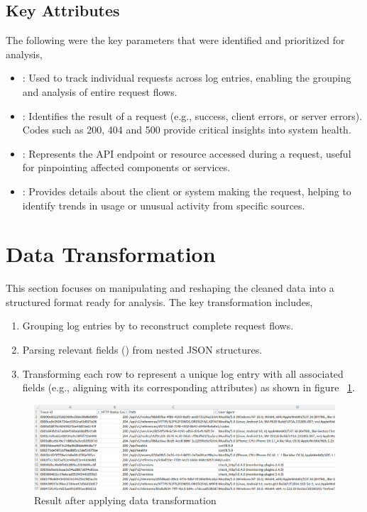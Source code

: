 \subsection{Key Attributes}
The following were the key parameters that were identified and prioritized for analysis,
\begin{itemize}
	\item {}: Used to track individual requests across log entries, enabling the grouping and analysis of entire request flows.
	\item {}: Identifies the result of a request (e.g., success, client errors, or server errors). Codes such as 200, 404 and 500 provide critical insights into system health.
	\item {}: Represents the API endpoint or resource accessed during a request, useful for pinpointing affected components or services.
	\item {}: Provides details about the client or system making the request, helping to identify trends in usage or unusual activity from specific sources.
\end{itemize}

\section{Data Transformation}

This section focuses on manipulating and reshaping the cleaned data into a structured format ready for analysis. The key transformation includes,

\begin{enumerate}
	\item Grouping log entries by  to reconstruct complete request flows.
	\item Parsing relevant fields () from nested JSON structures.
	\item Transforming each row to represent a unique log entry with all associated fields (e.g., aligning  with its corresponding attributes) as shown in figure ~\ref{DataTrans}.
\end{enumerate}

\begin{figure}
	\begin{center}
		\includegraphics[width=0.9\linewidth]{Images/DataTransformation.png}
		\caption{Result after applying data transformation}
		\label{DataTrans} 
	\end{center}
\end{figure}


